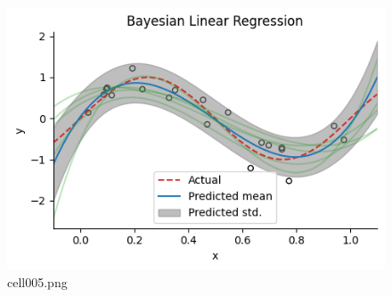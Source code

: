 \begin{figure}[ht]
	\centering
	\includegraphics[scale=0.8, max width=\linewidth]{./fig/bayesian-brain/bayesian-linear-regression/cell005.png}
	\caption{cell005.png}
	\label{cell005.png}
\end{figure}